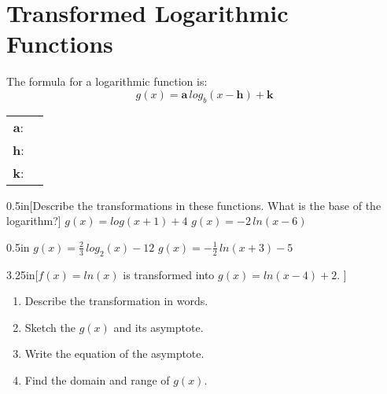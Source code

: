 \section{Transformed Logarithmic Functions}

\begin{myCenteredBox}[width=6in]
    The formula for a  logarithmic function is:
    {
    \large
    \[
        g(x) = {\boldsymbol a}\, log_b(x-{\boldsymbol h}) + {\boldsymbol k}
    \]
    }
    \begin{center}
        \renewcommand{\arraystretch}{1.5}
        \begin{tabular}{cl}
            $\boldsymbol a$: & \underline{\hspace{3in}} \\
            $\boldsymbol h$: & \underline{\hspace{3in}} \\ 
            $\boldsymbol k$: & \underline{\hspace{3in}} \\
        \end{tabular}
    \end{center}
\end{myCenteredBox}

\begin{my2Problems}{0.5in}[Describe the transformations in these functions. What is the base of the logarithm?]
    {
        $g(x) = log({x+1}) + 4$
    }
    {
        $g(x) = -2 \, ln({x-6}) $
    }
\end{my2Problems}
\begin{my2Problems}{0.5in}
    {
        $g(x) = \frac{2}{3} \, log_2({x}) - 12$
    }
    {
        $g(x) = -\frac{1}{2} \, ln({x+3})  - 5$
    }
\end{my2Problems}




\begin{myWideProblem}{3.25in}[$f(x) = ln(x)$ is transformed into $g(x)=ln(x-4) + 2$. ]
    {
        \small
        \begin{minipage}{0.54\textwidth}
            \begin{enumerate}[nosep]
                \item Describe the transformation in words.
                \item Sketch the $g(x)$ and its asymptote.
            \end{enumerate}
        \end{minipage}
        \hfil
        \begin{minipage}{0.45\textwidth}
            \begin{enumerate}[nosep]
                \setcounter{enumi}{2}
                \item Write the equation of the asymptote.
                \item Find the domain and range of $g(x)$.
            \end{enumerate}
        \end{minipage}
    }
\end{myWideProblem}


